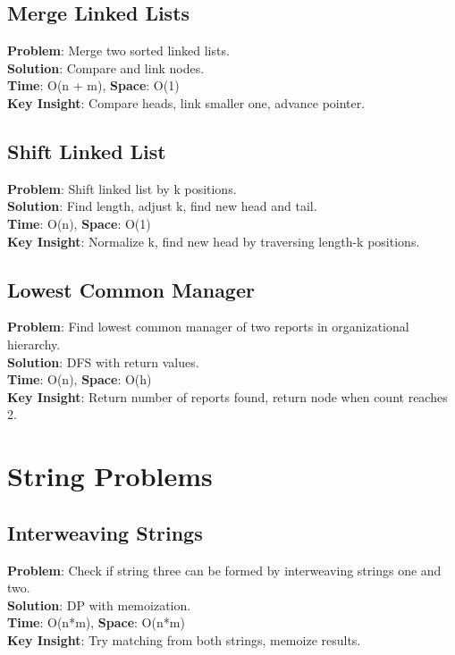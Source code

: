 \documentclass{report}
\begin{document}
\subsection{Merge Linked Lists}
\textbf{Problem}: Merge two sorted linked lists.\\
\textbf{Solution}: Compare and link nodes.\\
\textbf{Time}: O(n + m), \textbf{Space}: O(1)\\
\textbf{Key Insight}: Compare heads, link smaller one, advance pointer.

\subsection{Shift Linked List}
\textbf{Problem}: Shift linked list by k positions.\\
\textbf{Solution}: Find length, adjust k, find new head and tail.\\
\textbf{Time}: O(n), \textbf{Space}: O(1)\\
\textbf{Key Insight}: Normalize k, find new head by traversing length-k positions.

\subsection{Lowest Common Manager}
\textbf{Problem}: Find lowest common manager of two reports in organizational hierarchy.\\
\textbf{Solution}: DFS with return values.\\
\textbf{Time}: O(n), \textbf{Space}: O(h)\\
\textbf{Key Insight}: Return number of reports found, return node when count reaches 2.

\section{String Problems}

\subsection{Interweaving Strings}
\textbf{Problem}: Check if string three can be formed by interweaving strings one and two.\\
\textbf{Solution}: DP with memoization.\\
\textbf{Time}: O(n*m), \textbf{Space}: O(n*m)\\
\textbf{Key Insight}: Try matching from both strings, memoize results.
\end{document}
